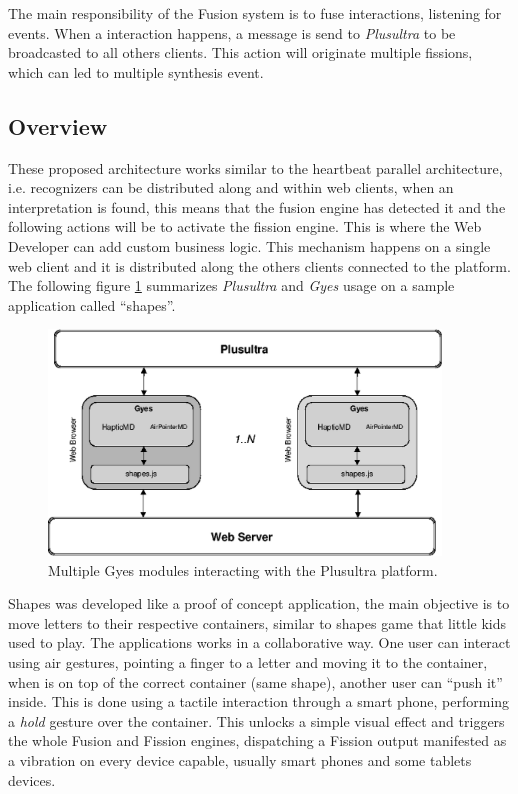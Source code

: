 \documentclass{llncs}
\begin{document}
The main responsibility of the Fusion system is to fuse interactions, listening for events. When a interaction happens, a message is send to \emph{Plusultra} to be broadcasted to all others clients. This action will originate multiple fissions, which can led to multiple synthesis event. 

\subsection{Overview}
These proposed architecture works similar to the heartbeat parallel architecture, i.e. recognizers can be distributed along and within web clients, when an interpretation is found, this means that the fusion engine has detected it and the following actions will be to activate the fission engine. This is where the Web Developer can add custom business logic. This mechanism happens on a single web client and it is distributed along the others clients connected to the platform. 
The following figure \ref{fig:shapes_arq_simple} summarizes \emph{Plusultra} and \emph{Gyes} usage on a sample application called ``shapes''.

\begin{figure}
	\centering
	\includegraphics[height=6cm]{shapes_app_arq_en_bw.eps}
	\caption{Multiple Gyes modules interacting with the Plusultra platform.}
	\label{fig:shapes_arq_simple}
\end{figure}

Shapes was developed like a proof of concept application, the main objective is to move letters to their respective containers, similar to shapes game that little kids used to play. The applications works in a collaborative way. One user can interact using air gestures, pointing a finger to a letter and moving it to the container, when is on top of the correct container (same shape), another user can ``push it'' inside. This is done using a tactile interaction through a smart phone, performing a \emph{hold} gesture over the container. 
This unlocks a simple visual effect and triggers the whole Fusion and Fission engines, dispatching a Fission output manifested as a vibration on every device capable, usually smart phones and some tablets devices.
\end{document}
